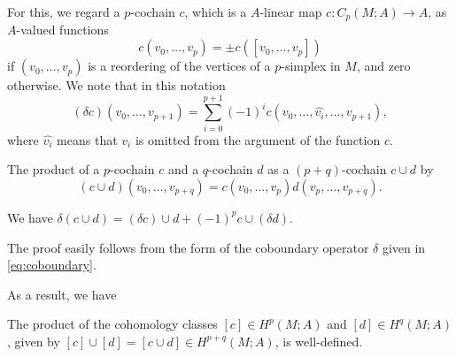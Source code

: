 \documentclass[12pt]{article}
\numberwithin{equation}{section}
\numberwithin{figure}{section}
\theoremstyle{remark}
\begin{document}
For this, we regard a  $p$-cochain $c$, which is a $A$-linear map $c:C_p(M;A)\to A$,
as $A$-valued functions \begin{equation}
c(v_0,\ldots,v_p) = \pm c([v_0,\ldots,v_p]) 
\end{equation}
if $(v_0,\ldots,v_p)$ is a reordering of the vertices of a $p$-simplex in $M$,
and zero otherwise.
We note that in this notation \begin{equation}
(\delta c)(v_0,\ldots,v_{p+1})= \sum_{i=0}^{p+1} (-1)^i c(v_0,\ldots,\widehat{v_i},\ldots,v_{p+1}),\label{eq:coboundary}
\end{equation} 
where $\widehat{v_i}$ means that $v_i$ is omitted from the argument of the function $c$.

\begin{definition}
The product of a $p$-cochain $c$ and a $q$-cochain $d$ as a $(p+q)$-cochain $c\cup d$ by \begin{equation}
(c\cup d)(v_0,\ldots,v_{p+q}) = c(v_0,\ldots,v_p) d(v_p,\ldots,v_{p+q}).
\end{equation}
\end{definition}

\begin{proposition}
We have $\delta(c\cup d) = (\delta c)\cup d + (-1)^p c\cup (\delta d)$.
\end{proposition}
The proof easily follows from the  form of the coboundary operator $\delta$ given in \eqref{eq:coboundary}.

As a result, we have
\begin{proposition}
The product of the cohomology classes $[c]\in H^p(M;A)$ and $[d]\in H^q(M;A)$,
given by $[c]\cup [d] = [c\cup d]\in H^{p+q}(M;A)$,
is well-defined.
\end{proposition}
\end{document}
